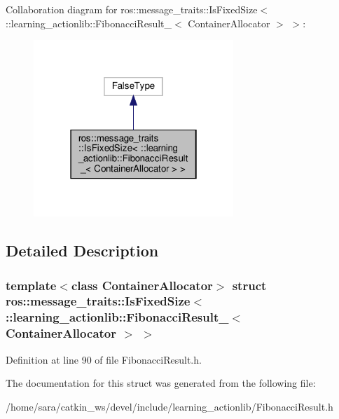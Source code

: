 Collaboration diagram for ros\+:\+:message\+\_\+traits\+:\+:Is\+Fixed\+Size$<$ \+:\+:learning\+\_\+actionlib\+:\+:Fibonacci\+Result\+\_\+$<$ Container\+Allocator $>$ $>$\+:
\nopagebreak
\begin{figure}[H]
\begin{center}
\leavevmode
\includegraphics[width=214pt]{structros_1_1message__traits_1_1IsFixedSize_3_01_1_1learning__actionlib_1_1FibonacciResult___3_037e1f16587121cb6724f05fdccd1ee12}
\end{center}
\end{figure}


\subsection{Detailed Description}
\subsubsection*{template$<$class Container\+Allocator$>$\newline
struct ros\+::message\+\_\+traits\+::\+Is\+Fixed\+Size$<$ \+::learning\+\_\+actionlib\+::\+Fibonacci\+Result\+\_\+$<$ Container\+Allocator $>$ $>$}



Definition at line 90 of file Fibonacci\+Result.\+h.



The documentation for this struct was generated from the following file\+:\begin{DoxyCompactItemize}
\item 
/home/sara/catkin\+\_\+ws/devel/include/learning\+\_\+actionlib/Fibonacci\+Result.\+h\end{DoxyCompactItemize}
